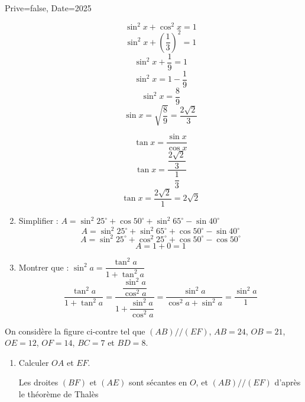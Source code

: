 \documentclass[a4paper,12pt]{article}
\begin{document}
\begin{Maquette}[Exam]{Prive=false, Date=2025}
\begin{exercice}[BaremeDetaille]
\begin{enumerate}
\begin{minipage}{0.48\linewidth}
$$\sin^{2}x+\cos^{2}x=1$$
$$\sin^{2}x+\left(\dfrac{1}{3}\right)^{2}=1$$
$$\sin^{2}x+\dfrac{1}{9}=1$$
$$\sin^{2}x=1-\dfrac{1}{9}$$
$$\sin^{2}x=\dfrac{8}{9}$$
$$\sin x=\sqrt{\dfrac{8}{9}}=\dfrac{2\sqrt{2}}{3}$$
\end{minipage}\hfill\vrule\hfill%
\begin{minipage}{0.48\linewidth}
$$\tan x=\dfrac{\sin x}{\cos x}$$
$$\tan x=\dfrac{\dfrac{2\sqrt{2}}{3}}{\dfrac{1}{3}}$$
$$\tan x=\dfrac{2\sqrt{2}}{1}=2\sqrt{2}$$
\end{minipage}
\item{} Simplifier  :
$A = \sin^{2}25^{\circ} +\cos50^{\circ} +\sin^{2}65^{\circ}-\sin40^{\circ}$
$$A = \sin^{2}25^{\circ} +\sin^{2}65^{\circ}+\cos50^{\circ}-\sin40^{\circ}$$
$$A = \sin^{2}25^{\circ} +\cos^{2}25^{\circ}+\cos50^{\circ}-\cos50^{\circ}$$
$$A = 1+0=1$$
\item{} Montrer que : $\sin^{2}a = \dfrac{\tan^{2}a}{1+\tan^{2}a}$
$$\dfrac{\tan^{2}a}{1+\tan^{2}a}=\dfrac{\dfrac{\sin^{2}a}{\cos^{2}a}}{1+\dfrac{\sin^{2}a}{\cos^{2}a}}=\dfrac{\sin^{2}a}{\cos^{2}a+\sin^{2}a}=\dfrac{\sin^{2}a}{1}$$

\end{enumerate}
\end{exercice}

\begin{exercice}[BaremeDetaille]
On considère la figure ci-contre tel que $(AB)//(EF)$, $AB=24$, $OB=21$, $OE=12$, $OF=14$, $BC=7$ et $BD=8$.
\vspace*{2mm}

\begin{minipage}{.7\linewidth}
\begin{enumerate}
\item{} Calculer $OA$ et $EF$.

Les droites $(BF)$ et $(AE)$ sont sécantes en $O$, et $(AB)//(EF)$ d'après le théorème de Thalès 


\end{enumerate}
\end{minipage}
\end{exercice}
\end{Maquette}
\end{document}
